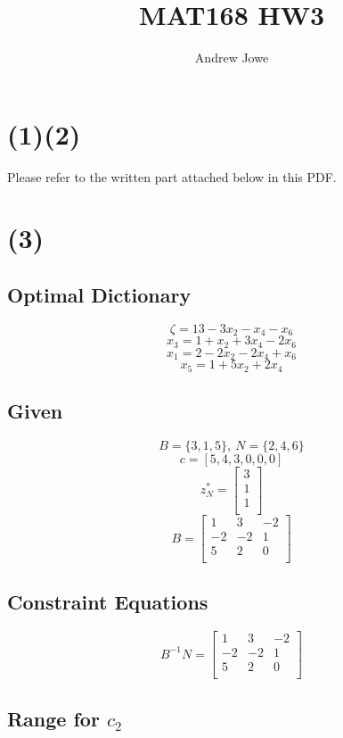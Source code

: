\documentclass[14pt]{extarticle}
\title{MAT168 HW3}
\author{Andrew Jowe}
\begin{document}
\maketitle

\section*{(1)(2)}
Please refer to the written part attached below in this PDF.

\section*{(3)}
\subsection*{Optimal Dictionary}
\[
    \zeta = 13-3x_2-x_4-x_6
\]
\[
    x_3 = 1+x_2+3x_4-2x_6
\]
\[
    x_1 = 2-2x_2-2x_4+x_6
\]
\[
    x_5 = 1+5x_2+2x_4
\]

\subsection*{Given}
\[
    B = \{3, 1, 5\},\ N = \{2, 4, 6\}
\]
\[
    c = [5, 4, 3, 0, 0, 0]
\]
\[
    z^*_N = \begin{bmatrix}
        3 \\
        1 \\
        1 \\
    \end{bmatrix}
\]
\[
    B = \begin{bmatrix}
        1 & 3 & -2 \\
        -2 & -2 & 1 \\
        5 & 2 & 0 \\
    \end{bmatrix}
\]

\subsection*{Constraint Equations}
\[
    B^{-1}N = \begin{bmatrix}
        1 & 3 & -2 \\
        -2 & -2 & 1 \\
        5 & 2 & 0 \\
    \end{bmatrix}
\]

\subsection*{Range for $c_2$}
\end{document}
